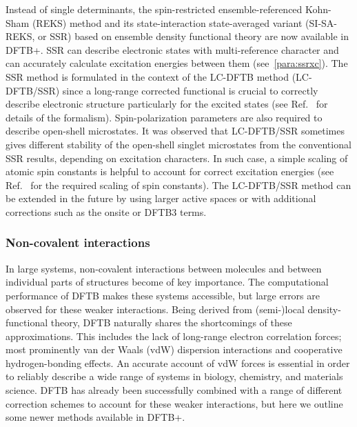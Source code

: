 \documentclass{revtex4-1}
\newcommand{\dftbp}{DFTB+}
\begin{document}
Instead of single determinants, the spin-restricted ensemble-referenced
Kohn-Sham (REKS) method and its state-interaction state-averaged variant
(SI-SA-REKS, or SSR)\cite{Kazaryan2008, Filatov2015, Filatov2016, Filatov1999,
  Moreira2007, Filatov2017} based on ensemble density functional theory are now
available in \dftbp{}. SSR can describe electronic states with multi-reference
character and can accurately calculate excitation energies between them
(see~\ref{para:ssrxc}). The SSR method is formulated in the context of the
LC-DFTB method (LC-DFTB/SSR)\cite{Lee19} since a long-range corrected functional
is crucial to correctly describe electronic structure particularly for the
excited states (see Ref.~ for details of the formalism).
Spin-polarization parameters are also required to describe open-shell
microstates.  It was observed that LC-DFTB/SSR sometimes gives different
stability of the open-shell singlet microstates from the conventional SSR
results, depending on excitation characters. In such case, a simple scaling of
atomic spin constants is helpful to account for correct excitation energies (see
Ref.~ for the required scaling of spin constants).  The
LC-DFTB/SSR method can be extended in the future by using larger active spaces
or with additional corrections such as the onsite or DFTB3 terms.

\subsubsection{Non-covalent interactions}

In large systems, non-covalent interactions between molecules and between
individual parts of structures become of key importance. The computational
performance of DFTB makes these systems accessible, but large errors are observed
for these weaker interactions. Being derived from (semi-)local
density-functional theory, DFTB naturally shares the shortcomings of these
approximations. This includes the lack of long-range electron correlation
forces; most prominently van der Waals (vdW) dispersion interactions and
cooperative hydrogen-bonding effects. An accurate account of vdW forces is
essential in order to reliably describe a wide range of systems in biology,
chemistry, and materials science.  DFTB has already been successfully combined
with a range of different correction schemes\cite{elstner2001, brandenburg2014,
  mortazavi2018, Rapacioli2009, Petraglia2015, Stoehr2016} to account for these
weaker interactions, but here we outline some newer methods available in
\dftbp{}.
\end{document}
